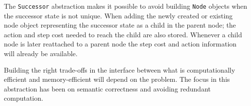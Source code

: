 The \texttt{Successor} abstraction makes it possible to avoid building \texttt{Node} objects when the successor state is not unique. When adding the newly created or existing node object representing the successor state as a child in the parent node; the action and step cost needed to reach the child are also stored. Whenever a child node is later reattached to a parent node the step cost and action information will already be available.

Building the right trade-offs in the interface between what is computationally efficient and memory-efficient will depend on the problem. The focus in this abstraction has been on semantic correctness and avoiding redundant computation.



